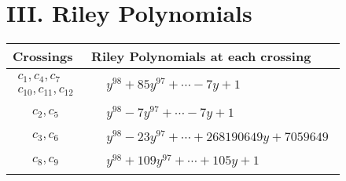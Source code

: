 \documentclass[1p]{elsarticle_modified}
\theoremstyle{definition}
\begin{document}
\centering \section*{ III. Riley Polynomials}
\begin{tabular}{m{50pt}|m{274pt}}
Crossings & \hspace{64pt}Riley Polynomials at each crossing \\
\hline $$\begin{aligned}c_{1},c_{4},c_{7}\\c_{10},c_{11},c_{12}\end{aligned}$$&$\begin{aligned}
&y^{98}+85 y^{97}+\cdots-7 y+1
\end{aligned}$\\
\hline $$\begin{aligned}c_{2},c_{5}\end{aligned}$$&$\begin{aligned}
&y^{98}-7 y^{97}+\cdots-7 y+1
\end{aligned}$\\
\hline $$\begin{aligned}c_{3},c_{6}\end{aligned}$$&$\begin{aligned}
&y^{98}-23 y^{97}+\cdots+268190649 y+7059649
\end{aligned}$\\
\hline $$\begin{aligned}c_{8},c_{9}\end{aligned}$$&$\begin{aligned}
&y^{98}+109 y^{97}+\cdots+105 y+1
\end{aligned}$\\
\hline
\end{tabular}
\vskip 2pc
\end{document}
